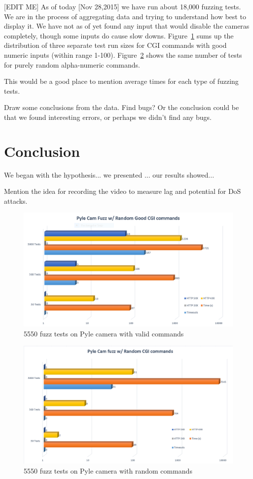 \documentclass[letterpaper,twocolumn,10pt]{article}
\begin{document}
[EDIT ME]
As of today [Nov 28,2015] we have run about 18,000 fuzzing tests. We are in the process of aggregating data and trying to understand how best to display it. We have not as of yet found any input that would disable the cameras completely, though some inputs do cause slow downs. Figure~\ref{fig:Pyle_Good_CGI} sums up the distribution of three separate test run sizes for CGI commands with good numeric inputs (within range 1-100). Figure~\ref{fig:Pyle_Rand_CGI} shows the same number of tests for purely random alpha-numeric commands.


This would be a good place to mention average times for each type of fuzzing tests. 

Draw some conclusions from the data. Find bugs? Or the conclusion could be that we found interesting errors, or perhaps we didn't find any bugs. 

\section{Conclusion}
We began with the hypothesis... we presented ... our results showed...

Mention the idea for recording the video to measure lag and potential for DoS attacks. 

\begin{figure}
\centering
\includegraphics[width=0.9\linewidth]{Pyle_Good_CGI}
\caption{ 5550 fuzz tests on Pyle camera with valid commands}
\label{fig:Pyle_Good_CGI}
\end{figure}

\begin{figure}
\centering
\includegraphics[width=0.9\linewidth]{Pyle_Rand_CGI}
\caption{5550 fuzz tests on Pyle camera with random commands}
\label{fig:Pyle_Rand_CGI}
\end{figure}





{\footnotesize 
}
\end{document}
